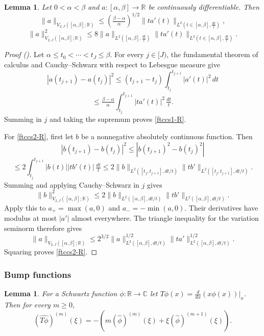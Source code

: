 \documentclass[12pt,reqno]{amsart}
\newcommand{\auto}{{({\tiny\faCar})}}
\theoremstyle{plain}
\newtheorem{lemma}[theorem]{Lemma}
\numberwithin{equation}{section}
\theoremstyle{remark}
\newcommand{\uses}[1]{}
\newcommand{\usesdefs}[1]{}
\newcommand{\R}{{\mathbb R}}
\begin{document}
\begin{lemma}\label{lem:ftccs-R}\uses{}\usesdefs{}   Let $0<\alpha < \beta$ and $a:[\alpha,\beta]\to \R$ be continuously differentiable.
    Then
\begin{equation}\label{ftccs1-R}
\|a\|_{V_{2,J}([\alpha, \beta]; \R)} \le (\tfrac{\beta-\alpha}{\alpha})^{1/2} \|ta'(t)\|_{L^2(t\in [\alpha, \beta],\tfrac{dt}{t})}, \end{equation}
\begin{equation}\label{ftccs2-R}
\|a\|_{V_{2,J}([\alpha, \beta]; \R)}^2 \le 8 \|a\|_{L^2([\alpha, \beta],\tfrac{dt}{t})}\|ta'(t)\|_{L^2(t\in [\alpha, \beta],\tfrac{dt}{t})}.
\end{equation}
\end{lemma}
\begin{proof}[Proof \auto]
Let $\alpha\le t_0<\cdots<t_J\le\beta$. For every $j\in[J)$, the fundamental theorem of calculus and Cauchy--Schwarz with respect to Lebesgue measure give
\[
|a(t_{j+1})-a(t_j)|^2
\le
(t_{j+1}-t_j)\int_{t_j}^{t_{j+1}}|a'(t)|^2\,dt
\]
\[
\le
\tfrac{\beta-\alpha}{\alpha}
\int_{t_j}^{t_{j+1}}|ta'(t)|^2\,\tfrac{dt}{t}.
\]
Summing in $j$ and taking the supremum proves \eqref{ftccs1-R}.

For \eqref{ftccs2-R}, first let $b$ be a nonnegative absolutely continuous function. Then
\[
|b(t_{j+1})-b(t_j)|^2
\le
|b(t_{j+1})^2-b(t_j)^2|
\]
\[
\le
2\int_{t_j}^{t_{j+1}}|b(t)||tb'(t)|\,\tfrac{dt}{t}
\le
2\|b\|_{L^2([t_j,t_{j+1}],dt/t)}
\|tb'\|_{L^2([t_j,t_{j+1}],dt/t)}.
\]
Summing and applying Cauchy--Schwarz in $j$ gives
\[
\|b\|_{V_{2,J}([\alpha,\beta];\R)}^2
\le
2\|b\|_{L^2([\alpha,\beta],dt/t)}
\|tb'\|_{L^2([\alpha,\beta],dt/t)}.
\]
Apply this to $a_+=\max(a,0)$ and $a_-=-\min(a,0)$. Their derivatives have modulus at most $|a'|$ almost everywhere. The triangle inequality for the variation seminorm therefore gives
\[
\|a\|_{V_{2,J}([\alpha,\beta];\R)}
\le
2^{3/2}\|a\|_{L^2([\alpha,\beta],dt/t)}^{1/2}
\|ta'\|_{L^2([\alpha,\beta],dt/t)}^{1/2}.
\]
Squaring proves \eqref{ftccs2-R}.
\end{proof}

\subsubsection{Bump functions}\label{sec:bump red}

\begin{lemma}\label{lem:ft_deriv_mul}\uses{}\usesdefs{}
For a Schwartz function $\phi:\mathbb{R}\to\mathbb{C}$ let
$T\phi(x)=\frac{d}{dx} (x \phi(x))|_x$. Then
for every $m\ge 0$,
\begin{equation}\label{auto:Fourier-derivatives-of-T}(\widehat{T\phi})^{(m)}(\xi) = -(m (\widehat{\phi})^{(m)}(\xi) + \xi (\widehat{\phi})^{(m+1)}(\xi)).\end{equation}
\end{lemma}
\end{document}
